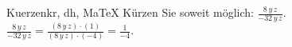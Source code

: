 \begin{MAufgabe}{Kuerzen}{kr, dh, MaTeX}
K\"urzen Sie soweit m\"oglich: $\frac{8\, y\, z}{- 32\, y\, z}$.\\ 
\ifLsg\MLoesung
\quad $\frac{8\, y\, z}{- 32\, y\, z}=\frac{(8\, y\, z)\cdot(1)}{(8\, y\, z)\cdot(-4)}=\frac{1}{-4}$.\else\relax\fi
 \end{MAufgabe}
